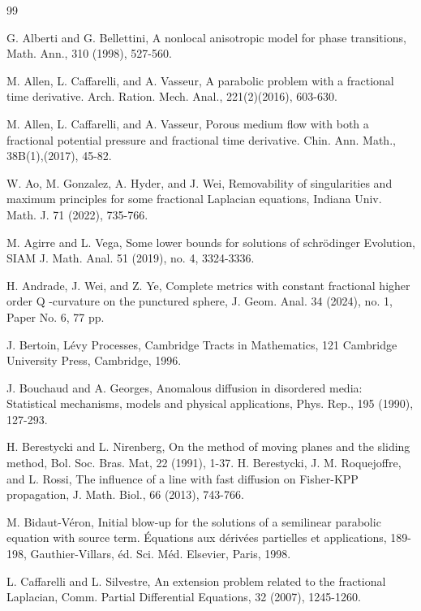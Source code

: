 \documentclass[12pt]{article}
\theoremstyle{remark}
\numberwithin{equation}{section}
\begin{document}
\begin{thebibliography}{99}


 G. Alberti and G. Bellettini, A nonlocal anisotropic model for phase transitions, Math. Ann., 310 (1998), 527-560.

 M. Allen, L. Caffarelli, and A. Vasseur, A parabolic problem with a fractional time derivative. Arch. Ration. Mech. Anal., 221(2)(2016), 603-630.

 M. Allen, L. Caffarelli, and A. Vasseur,  Porous medium flow with both a fractional potential pressure and fractional time derivative. Chin. Ann. Math., 38B(1),(2017), 45-82.

 W. Ao,  M. Gonzalez, A. Hyder, and J. Wei, Removability of singularities and maximum principles for some fractional Laplacian equations, Indiana Univ. Math. J. 71 (2022), 735-766.

    M. Agirre and L. Vega, Some lower bounds for solutions of schr\"odinger Evolution, SIAM J. Math. Anal. 51 (2019), no. 4, 3324-3336.

    H. Andrade, J. Wei, and Z. Ye,  Complete metrics with constant fractional higher order  Q -curvature on the punctured sphere,  J. Geom. Anal. 34 (2024), no. 1, Paper No. 6, 77 pp.

 J. Bertoin,  L\'{e}vy Processes,   Cambridge Tracts in Mathematics, 121 Cambridge University
Press, Cambridge, 1996.




 J. Bouchaud and A. Georges, Anomalous diffusion in disordered media: Statistical mechanisms, models and physical applications, Phys. Rep., 195 (1990), 127-293.

H. Berestycki and L. Nirenberg, On the method of moving planes and the sliding method, Bol. Soc. Bras. Mat, 22 (1991), 1-37.
 H. Berestycki, J. M. Roquejoffre, and L. Rossi, The influence of a line with fast diffusion on Fisher-KPP propagation, J. Math. Biol., 66 (2013), 743-766.

M. Bidaut-V\'{e}ron, Initial blow-up for the solutions of a semilinear parabolic equation with source term. \'{E}quations aux d\'{e}riv\'{e}es partielles et applications, 189-198, Gauthier-Villars, \'{e}d. Sci. M\'{e}d. Elsevier, Paris, 1998.

 L. Caffarelli and L. Silvestre, An extension problem related to the fractional Laplacian, Comm. Partial Differential Equations, 32 (2007), 1245-1260.


\end{thebibliography}
\end{document}
